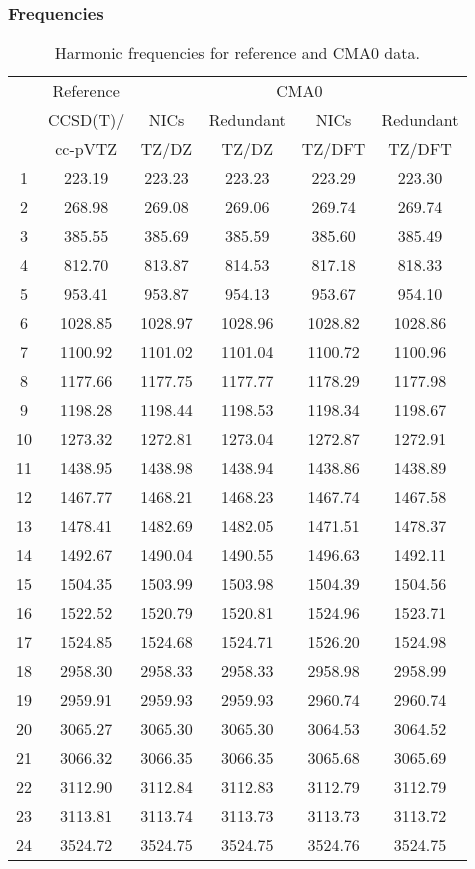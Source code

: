 \documentclass[10pt,oneside]{article}
\begin{document}
\begin{table}[h!]
\subsubsection*{Frequencies}
\centering
\caption{Harmonic frequencies for reference and CMA0 data.}
\begin{tabular}{cccccc}
\toprule
{} & Reference & \multicolumn{4}{c}{CMA0} \\
{} &  CCSD(T)/ &    NICs &  Redundant &    NICs & Redundant \\
{} &   cc-pVTZ &   TZ/DZ &      TZ/DZ &  TZ/DFT &    TZ/DFT \\
\midrule
1  &    223.19 &  223.23 &     223.23 &  223.29 &    223.30 \\
2  &    268.98 &  269.08 &     269.06 &  269.74 &    269.74 \\
3  &    385.55 &  385.69 &     385.59 &  385.60 &    385.49 \\
4  &    812.70 &  813.87 &     814.53 &  817.18 &    818.33 \\
5  &    953.41 &  953.87 &     954.13 &  953.67 &    954.10 \\
6  &   1028.85 & 1028.97 &    1028.96 & 1028.82 &   1028.86 \\
7  &   1100.92 & 1101.02 &    1101.04 & 1100.72 &   1100.96 \\
8  &   1177.66 & 1177.75 &    1177.77 & 1178.29 &   1177.98 \\
9  &   1198.28 & 1198.44 &    1198.53 & 1198.34 &   1198.67 \\
10 &   1273.32 & 1272.81 &    1273.04 & 1272.87 &   1272.91 \\
11 &   1438.95 & 1438.98 &    1438.94 & 1438.86 &   1438.89 \\
12 &   1467.77 & 1468.21 &    1468.23 & 1467.74 &   1467.58 \\
13 &   1478.41 & 1482.69 &    1482.05 & 1471.51 &   1478.37 \\
14 &   1492.67 & 1490.04 &    1490.55 & 1496.63 &   1492.11 \\
15 &   1504.35 & 1503.99 &    1503.98 & 1504.39 &   1504.56 \\
16 &   1522.52 & 1520.79 &    1520.81 & 1524.96 &   1523.71 \\
17 &   1524.85 & 1524.68 &    1524.71 & 1526.20 &   1524.98 \\
18 &   2958.30 & 2958.33 &    2958.33 & 2958.98 &   2958.99 \\
19 &   2959.91 & 2959.93 &    2959.93 & 2960.74 &   2960.74 \\
20 &   3065.27 & 3065.30 &    3065.30 & 3064.53 &   3064.52 \\
21 &   3066.32 & 3066.35 &    3066.35 & 3065.68 &   3065.69 \\
22 &   3112.90 & 3112.84 &    3112.83 & 3112.79 &   3112.79 \\
23 &   3113.81 & 3113.74 &    3113.73 & 3113.73 &   3113.72 \\
24 &   3524.72 & 3524.75 &    3524.75 & 3524.76 &   3524.75 \\
\bottomrule
\end{tabular}
\end{table}
\end{document}
